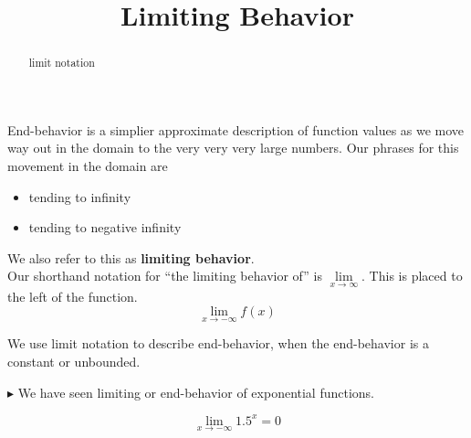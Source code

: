 \documentclass{ximera}
\title{Limiting Behavior}
\begin{document}
\begin{abstract}
limit notation
\end{abstract}
\maketitle




End-behavior is a simplier approximate description of function values as we move way out in the domain to the very very very large numbers.  Our phrases for this movement in the domain are 

\begin{itemize}
\item tending to infinity
\item tending to negative infinity
\end{itemize}


We also refer to this as \textbf{limiting behavior}. \\


Our shorthand notation for ``the limiting behavior of'' is $\lim\limits_{x \to \infty}$.  This is placed to the left of the function. \\


\[   \lim_{x \to -\infty} f(x)     \]



We use limit notation to describe end-behavior, when the end-behavior is a constant or unbounded.






$\blacktriangleright$  We have seen limiting or end-behavior of exponential functions.


\[   \lim_{x \to -\infty} 1.5^x   = 0      \]


\begin{image}
\end{image}
\end{document}

